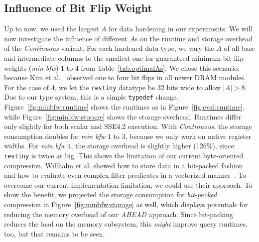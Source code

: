 \subsection{Influence of Bit Flip Weight}
Up to now, we used the largest \(A\) for data hardening in our experiments. We will now investigate the influence of different \(A\)s on the runtime and storage overhead of the \emph{Continuous} variant. For each hardened data type, we vary the \(A\) of all base and intermediate columns to the smallest one for guaranteed minimum bit flip weights (\emph{min bfw}) $1$ to $4$ from Table~\ref{tab:optimalAs}. We chose this scenario, because Kim et al.~\cite{DBLP:conf/isca/KimDKFLLWLM14} observed one to four bit flips in all newer DRAM modules. For the case of $4$, we let the \texttt{restiny} datatype be 32 bits wide to allow $|A|>8$. Due to our type system, this is a simple \texttt{typedef} change. Figure~\ref{fig:minbfw:runtime} shows the runtimes as in Figure~\ref{fig:eval:runtime}, while Figure~\ref{fig:minbfw:storage} shows the storage overhead. Runtimes differ only slightly for both scalar and SSE4.2 execution. With \emph{Continuous}, the storage consumption doubles for \emph{min bfw} $1$ to $3$, because we only work on native register widths. For \emph{min bfw} $4$, the storage overhead is slightly higher (126\%), since \texttt{restiny} is twice as big. This shows the limitation of our current byte-oriented compression. Willhalm et al. showed how to store data in a bit-packed fashion and how to evaluate even complex filter predicates in a vectorized manner~\cite{Willhalm:2009:SUF:1687627.1687671,willhalm2013vectorizing}. To overcome our current implementation limitation, we could use their approach. To show the benefit, we projected the storage consumption for \emph{bit-packed} compression in Figure~\ref{fig:minbfw:storage} as well, which displays potentials for reducing the memory overhead of our \emph{AHEAD} approach. Since bit-packing reduces the load on the memory subsystem, this \emph{might} improve query runtimes, too, but that remains to be seen.
